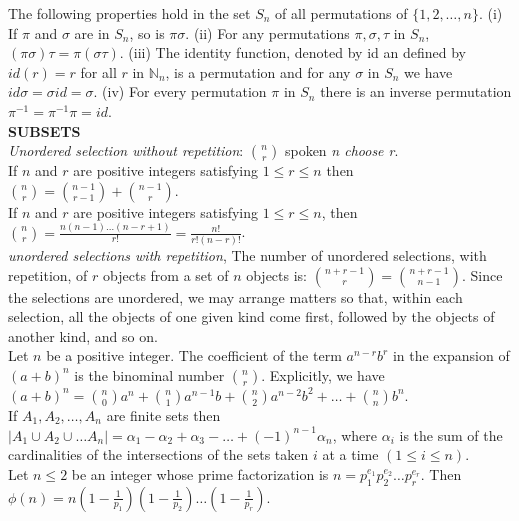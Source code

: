 \documentclass[10pt,landscape]{article}
\begin{document}
\begin{multicols}{4}
The following properties hold in the set $S_{n}$ of all permutations
of $\{1,2,\dots,n\}$. (i) If $\pi$ and $\sigma$ are in $S_{n}$, so is
$\pi\sigma$. (ii) For any permutations $\pi, \sigma, \tau$ in $S_{n}$,
$(\pi\sigma)\tau = \pi(\sigma\tau)$.
(iii) The identity function, denoted by id an defined by $id(r) = r$
for all $r$ in $\mathbb{N}_{n}$, is a permutation and for any $\sigma$
in $S_{n}$ we have $id \sigma = \sigma id = \sigma$.
(iv) For every permutation $\pi$ in $S_{n}$ there is an inverse
permutation $\pi^{-1} = \pi^{-1}\pi = id$.\\

\textbf{SUBSETS}\\
\textit{Unordered selection without repetition}: $\binom{n}{r}$ spoken
\textit{n choose r}. \\
If $n$ and $r$ are positive integers satisfying $1 \leq r \leq n$ then
$\binom{n}{r} = \binom{n-1}{r-1} + \binom{n-1}{r}$.\\
If $n$ and $r$ are positive integers satisfying $1 \leq r \leq n$,
then $\binom{n}{r} =
\frac{n(n-1)\dots (n-r+1)}{r!}=\frac{n!}{r!(n-r)!}$.\\
\textit{unordered selections with repetition}, The number of unordered
selections, with repetition, of $r$ objects from a set of $n$ objects
is: $\binom{n+r-1}{r} = \binom{n+r-1}{n-1}$. Since the selections are
unordered, we may arrange matters so that, within each selection, all
the objects of one given kind come first, followed by the objects of
another kind, and so on.\\
Let $n$ be a positive integer. The coefficient of the term
$a^{n-r}b^{r}$ in the expansion of $(a + b)^{n}$ is the binominal
number $\binom{n}{r}$. Explicitly, we have
$(a+b)^{n}=\binom{n}{0}a^{n}+ \binom{n}{1}a^{n-1}b+ \binom{n}{2}a^{n-2}b^{2}+\dots+\binom{n}{n}b^{n}$.\\
If $A_{1},A_{2},\dots,A_{n}$ are finite sets then $|A_{1} \cup A_{2}
\cup \dots A_{n}| =
\alpha_{1}-\alpha_{2}+\alpha_{3}-\dots+(-1)^{n-1}\alpha_{n}$, where
$\alpha_{i}$ is the sum of the cardinalities of the intersections of
the sets taken $i$ at a time $(1 \leq i \leq n)$.\\
Let $n \leq 2$ be an integer whose prime factorization is $n =
p_{1}^{e_{1}}p_{2}^{e_{2}}\dots p_{r}^{e_{r}}$. Then $\phi (n) =
n(1-\frac{1}{p_{1}})(1- \frac{1}{p_{2}})\dots (1- \frac{1}{p_{r}})$.


\end{multicols}
\end{document}
